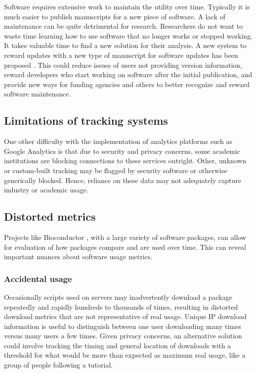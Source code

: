 \documentclass{article}
\begin{document}
Software requires extensive work to maintain the utility over time. Typically it is much easier to publish manuscripts for a new piece of software. A lack of maintenance can be quite detrimental for research. Researchers do not want to waste time learning how to use software that no longer works or stopped working. It takes valuable time 
 to find a new solution for their analysis. A new system to reward updates with a new type of manuscript for software updates has been proposed \cite{merow_better_2023}. This could reduce issues of users not providing version information, reward developers who start working on software after the initial publication, and provide new ways for funding agencies and others to better recognize and reward software maintenance. 

\subsection{Limitations of tracking systems}

One other difficulty with the implementation of analytics platforms such as Google Analytics is that due to security and privacy concerns, some academic institutions are blocking connections to these services outright. Other, unknown or custom-built tracking may be flagged by security software or otherwise generically blocked. Hence, reliance on these data may not adequately capture industry or academic usage.

\subsection{Distorted metrics}

Projects like Bioconductor \cite{bioconductor}, with a large variety of software packages, can allow for evaluation of how packages compare and are used over time. This can reveal important nuances about software usage metrics. 

\subsubsection{Accidental usage} 
Occasionally scripts used on servers may inadvertently download a package repeatedly and rapidly hundreds to thousands of times, resulting in distorted download metrics that are not representative of real usage. Unique IP download information is useful to distinguish between one user downloading many times versus many users a few times. Given privacy concerns, an alternative solution could involve tracking the timing and general location of downloads with a threshold for what would be more than expected as maximum real usage, like a group of people following a tutorial.
\end{document}

